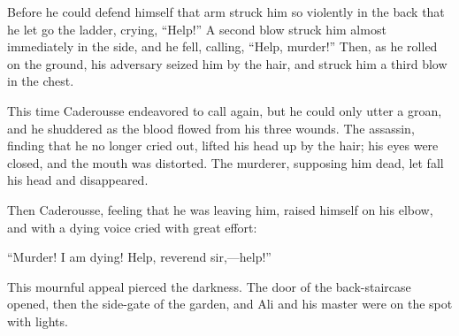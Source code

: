 Before he could defend himself that arm struck him so violently in the
back that he let go the ladder, crying, “Help!” A second blow struck
him almost immediately in the side, and he fell, calling, “Help,
murder!” Then, as he rolled on the ground, his adversary seized him by
the hair, and struck him a third blow in the chest.

This time Caderousse endeavored to call again, but he could only utter
a groan, and he shuddered as the blood flowed from his three wounds.
The assassin, finding that he no longer cried out, lifted his head up
by the hair; his eyes were closed, and the mouth was distorted. The
murderer, supposing him dead, let fall his head and disappeared.

Then Caderousse, feeling that he was leaving him, raised himself on his
elbow, and with a dying voice cried with great effort:

“Murder! I am dying! Help, reverend sir,—help!”

This mournful appeal pierced the darkness. The door of the
back-staircase opened, then the side-gate of the garden, and Ali and
his master were on the spot with lights.
